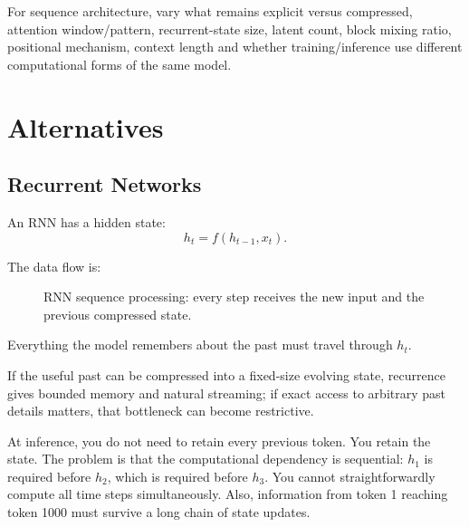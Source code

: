 \begin{calloutdegreeofexperiment}
For sequence architecture, vary what remains explicit versus compressed, attention window/pattern, recurrent-state size, latent count, block mixing ratio, positional mechanism, context length and whether training/inference use different computational forms of the same model.
\end{calloutdegreeofexperiment}





\section{Alternatives}
\subsection{Recurrent Networks}
\label{subsec:modern-rnn}
An RNN has a hidden state:
\[
h_t=f(h_{t-1},x_t).
\]

The data flow is:
\begin{figure}[htbp]
\centering
{}
\caption{RNN sequence processing: every step receives the new input and the previous compressed state.}
\label{fig:modern-rnn-flow}
\end{figure}

Everything the model remembers about the past must travel through $h_t$.

\begin{calloutbias}
If the useful past can be compressed into a fixed-size evolving state, recurrence gives bounded memory and natural streaming; if exact access to arbitrary past details matters, that bottleneck can become restrictive.
\end{calloutbias}

At inference, you do not need to retain every previous token.
You retain the state.
The problem is that the computational dependency is sequential: $h_1$ is required before $h_2$, which is required before $h_3$.
You cannot straightforwardly compute all time steps simultaneously.
Also, information from token 1 reaching token 1000 must survive a long chain of state updates.
